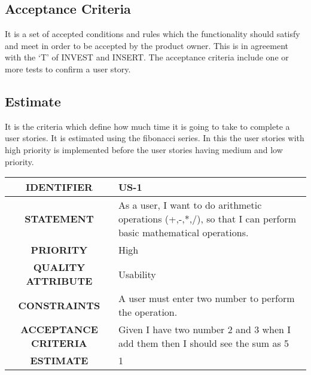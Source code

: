 \documentclass[12pt, a4paper]{article}
\begin{document}
\subsection{Acceptance Criteria}
It is a set of accepted conditions and rules which the functionality should satisfy and meet in order to be accepted by the product owner. This is in agreement with the ‘T’ of INVEST and INSERT. The acceptance criteria include one or more tests to confirm a user story. 

\subsection{Estimate} It is the criteria which define how much time it is going to take to complete a user stories. It is estimated using the fibonacci series. In this the user stories with high priority is implemented before the user stories having medium and low priority.

\newpage
\vspace*{1 cm}

\begin{tabular}{|c|p{10cm}|}
    \hline
    \textbf{IDENTIFIER}     & US-1 \\
    \hline
    \textbf{STATEMENT} & As a user, I want to do arithmetic operations (+,-,*,/), so that I can perform basic mathematical operations.\\
    \hline
    \textbf{PRIORITY}     & High \\
    \hline
    \textbf{QUALITY ATTRIBUTE}     & Usability \\
    \hline
    \textbf{CONSTRAINTS}     & A user must enter two number to perform the operation.\\
    \hline
    \textbf{ACCEPTANCE CRITERIA}    & Given I have two number 2 and 3 when I add them then I should see the sum as 5 \\
    \hline
    \textbf{ESTIMATE}     & 1 \\
    \hline
\end{tabular}

\end{document}
